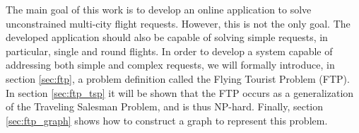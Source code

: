 The main goal of this work is to develop an online application to solve unconstrained multi-city flight requests. However, this is not the only goal. The developed application should also be capable of solving simple requests, in particular, single and round flights. In order to develop a system capable of addressing both simple and complex requests, we will formally introduce, in section \ref{sec:ftp}, a problem definition called the Flying Tourist Problem (FTP). In section \ref{sec:ftp_tsp} it will be shown that the FTP occurs as a generalization of the Traveling Salesman Problem, and is thus NP-hard. Finally, section \ref{sec:ftp_graph} shows how to construct a graph to represent this problem.
